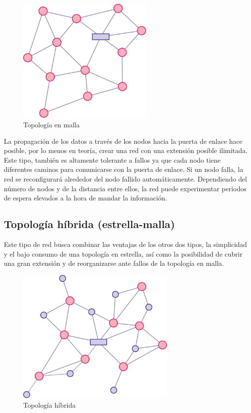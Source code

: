 \begin{figure}[htb]
    \centering
    \includegraphics[width=0.6\textwidth]{imagenes/malla.png}
    \caption{Topología en malla}
    \label{fig:top_malla}
\end{figure}

La propagaci\'on de los datos a trav\'es de los nodos hacia la puerta de enlace hace posible, por lo menos en teor\'ia, crear una red con una extensi\'on posible ilimitada. Este tipo, tambi\'en es altamente tolerante a fallos ya que cada nodo tiene diferentes caminos para comunicarse con la puerta de enlace. Si un nodo falla, la red se reconfigurar\'a alrededor del nodo fallido autom\'aticamente. Dependiendo del n\'umero de nodos y de la distancia entre ellos, la red puede experimentar periodos de espera elevados a la hora de mandar la informaci\'on. 

\subsection{Topolog\'ia h\'ibrida (estrella-malla)}
Este tipo de red busca combinar las ventajas de los otros dos tipos, la simplicidad y el bajo consumo de una topolog\'ia en estrella, as\'i como la posibilidad de cubrir una gran extensi\'on y de reorganizarse ante fallos de la topolog\'ia en malla.

\begin{figure}[htb]
    \centering
    \includegraphics[width=0.7\textwidth]{imagenes/hibridamalla.png}
    \caption{Topología híbrida}
    \label{fig:top_hibrida}
\end{figure}

